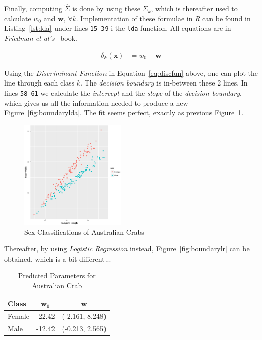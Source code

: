 \documentclass[a4paper, twocolumn]{article}
\begin{document}
        Finally, computing $\hat{\Sigma}$ is done by using these $\Sigma_k$, which is thereafter used to calculate $w_0$ and $\bm{w},\, \forall k$. Implementation of these formulae in \emph{R} can be found in Listing~\ref{lst:lda} under lines \texttt{15-39} i the \texttt{lda} function. All equations are in \emph{Friedman et al's}~\cite{friedman2009elements} book.

        \begin{equation} \label{eq:discfun}
        \begin{split}
            \delta_k(\bm{x}) &= w_0 + \bm{w}
        \end{split}
        \end{equation}

        Using the \emph{Discriminant Function} in Equation~\ref{eq:discfun} above, one can plot the line through each class $k$. The \emph{decision boundary} is in-between these 2 lines. In lines \texttt{58-61} we calculate the \emph{intercept} and the \emph{slope} of the \emph{decision boundary}, which gives us all the information needed to produce a new Figure~\ref{fig:boundarylda}. The fit seems perfect, exactly as previous Figure~\ref{fig:crabs}.

        \begin{figure}[h!]
            \centering
            \caption{Sex Classifications of Australian Crabs}
            \label{fig:crabs}
            \includegraphics[width=0.45\textwidth]{share/crabs.eps}
        \end{figure}

        \clearpage

        Thereafter, by using \emph{Logistic Regression} instead, Figure~\ref{fig:boundarylr} can be obtained, which is a bit different...

        \begin{table}[h!]
        \begin{center}
        \begin{tabular}{lcc}
            \toprule
                \textbf{Class} & $\bm{w_0}$ & $\bm{w}$ \\
            \midrule
                Female & -22.42 & (-2.161, 8.248) \\
                Male & -12.42 & (-0.213, 2.565) \\
            \bottomrule
        \end{tabular}
        \end{center}
        \caption{Predicted Parameters for Australian Crab}
        \label{table:parameters}
        \end{table}
\end{document}
